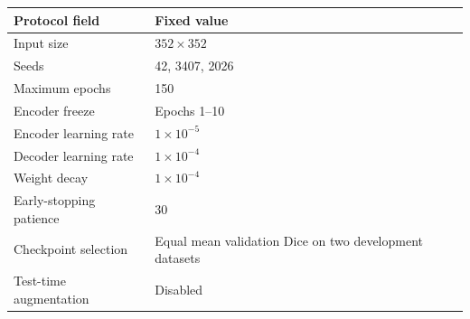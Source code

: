\begin{tabular}{ll}
\hline
Protocol field & Fixed value \\
\hline
Input size & $352 \times 352$ \\
Seeds & 42, 3407, 2026 \\
Maximum epochs & 150 \\
Encoder freeze & Epochs 1--10 \\
Encoder learning rate & $1\times10^{-5}$ \\
Decoder learning rate & $1\times10^{-4}$ \\
Weight decay & $1\times10^{-4}$ \\
Early-stopping patience & 30 \\
Checkpoint selection & Equal mean validation Dice on two development datasets \\
Test-time augmentation & Disabled \\
\hline
\end{tabular}
